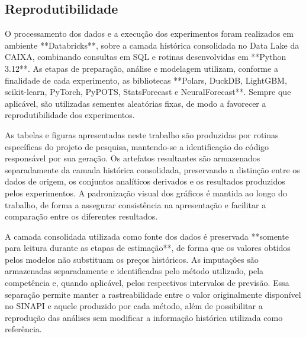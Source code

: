 \subsection{Reprodutibilidade}

O processamento dos dados e a execução dos experimentos foram realizados em ambiente **Databricks**, sobre a camada histórica 
consolidada no Data Lake da CAIXA, combinando consultas em SQL e rotinas desenvolvidas em **Python 3.12**. As etapas de 
preparação, análise e modelagem utilizam, conforme a finalidade de cada experimento, as bibliotecas **Polars, DuckDB, LightGBM, 
scikit-learn, PyTorch, PyPOTS, StatsForecast e NeuralForecast**. Sempre que aplicável, são utilizadas sementes aleatórias fixas, 
de modo a favorecer a reprodutibilidade dos experimentos.

As tabelas e figuras apresentadas neste trabalho são produzidas por rotinas específicas do projeto de pesquisa, mantendo-se a 
identificação do código responsável por sua geração. Os artefatos resultantes são armazenados separadamente da camada histórica 
consolidada, preservando a distinção entre os dados de origem, os conjuntos analíticos derivados e os resultados produzidos pelos 
experimentos. A padronização visual dos gráficos é mantida ao longo do trabalho, de forma a assegurar consistência na apresentação 
e facilitar a comparação entre os diferentes resultados.

A camada consolidada utilizada como fonte dos dados é preservada **somente para leitura durante as etapas de estimação**, 
de forma que os valores obtidos pelos modelos não substituam os preços históricos. As imputações são armazenadas separadamente 
e identificadas pelo método utilizado, pela competência e, quando aplicável, pelos respectivos intervalos de previsão. 
Essa separação permite manter a rastreabilidade entre o valor originalmente disponível no SINAPI e aquele produzido por cada 
método, além de possibilitar a reprodução das análises sem modificar a informação histórica utilizada como referência.